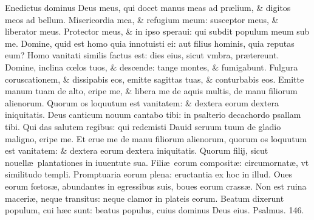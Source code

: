 \documentclass[a5paper,10pt]{book}
\def\ae{æ}
\def\oe{œ}
\begin{document}
\begin{multicols*}{2}
Enedictus dominus Deus meus, qui docet manus meas ad pr\ae lium, \& digitos meos ad bellum.
\newline \color{red} M\color{black}isericordia mea, \& refugium meum: susceptor meus, \& liberator meus.
\newline \color{red} P\color{black}rotector meus, \& in ipso speraui: qui subdit populum meum sub me.
\newline \color{red} D\color{black}omine, quid est homo quia innotuisti ei: aut filius hominis, quia reputas eum?
\newline \color{red} H\color{black}omo vanitati similis factus est: dies eius, sicut vmbra, pr\ae tereunt.
\newline \color{red} D\color{black}omine, inclina c\oe los tuos, \& descende: tange montes, \& fumigabunt.
\newline \color{red} F\color{black}ulgura coruscationem, \& dissipabis eos, emitte sagittas tuas, \& conturbabis eos.
\newline \color{red} E\color{black}mitte manum tuam de alto, eripe me, \& libera me de aquis multis, de manu filiorum alienorum.
\newline \color{red} Q\color{black}uorum os loquutum est vanitatem: \& dextera eorum dextera iniquitatis.
\newline \color{red} D\color{black}eus canticum nouum cantabo tibi: in psalterio decachordo psallam tibi.
\newline \color{red} Q\color{black}ui das salutem regibus: qui redemisti Dauid seruum tuum de gladio maligno, eripe me.
\newline \color{red} E\color{black}t erue me de manu filiorum alienorum, quorum os loquutum est vanitatem: \& dextera eorum dextera iniquitatis.
\newline \color{red} Q\color{black}uorum filij, sicut nouell\ae \ plantationes in iuuentute sua.
\newline \color{red} F\color{black}ili\ae \ eorum composit\ae : circumornat\ae , vt similitudo templi.
\newline \color{red} P\color{black}romptuaria eorum plena: eructantia ex hoc in illud.
\newline \color{red} O\color{black}ues eorum f\oe tos\ae , abundantes in egressibus suis, boues eorum crass\ae .
\newline \color{red} N\color{black}on est ruina maceri\ae , neque transitus: neque clamor in plateis eorum.
\newline \color{red} B\color{black}eatum dixerunt populum, cui h\ae c sunt: beatus populus, cuius dominus Deus eius. \quad \color{red} Psalmus. \hypertarget{ps146}{146.} \color{black}

\end{multicols*}
\end{document}
